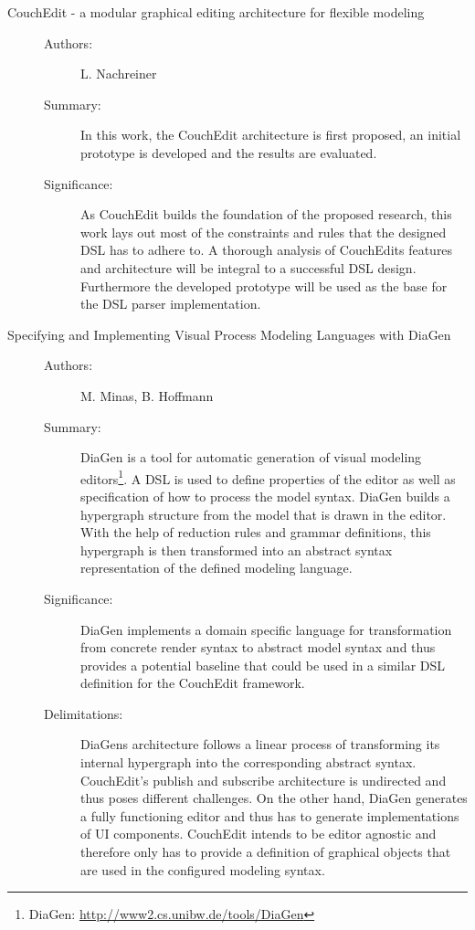 \documentclass[10pt,a4paper,oneside]{scrartcl}
\begin{document}
\begin{description}
  \item[CouchEdit - a modular graphical editing architecture for flexible modeling] \cite{nachreiner_couchedit_2020}

        \begin{description}
          \item[Authors:] L. Nachreiner
          \item[Summary:] In this work, the CouchEdit architecture is first proposed, an initial prototype is developed and the results are evaluated.
          \item[Significance:] As CouchEdit builds the foundation of the proposed research, this work lays out most of the constraints and rules that the designed DSL has to adhere to. A thorough analysis of CouchEdits features and architecture will be integral to a successful DSL design. Furthermore the developed prototype will be used as the base for the DSL parser implementation.

        \end{description}

  \item[Specifying and Implementing Visual Process Modeling Languages with DiaGen] \cite{minas_specifying_2001}
        \begin{description}
          \item[Authors:] M. Minas, B. Hoffmann
          \item[Summary:] DiaGen is a tool for automatic generation of visual modeling editors\footnote{DiaGen: \url{http://www2.cs.unibw.de/tools/DiaGen}}. A DSL is used to define properties of the editor as well as specification of how to process the model syntax. DiaGen builds a hypergraph structure from the model that is drawn in the editor. With the help of reduction rules and grammar definitions, this hypergraph is then transformed into an abstract syntax representation of the defined modeling language.
          \item[Significance:]  DiaGen implements a domain specific language for transformation from concrete render syntax to abstract model syntax and thus provides a potential baseline that could be used in a similar DSL definition for the CouchEdit framework.
          \item[Delimitations:] DiaGens architecture follows a linear process of transforming its internal hypergraph into the corresponding abstract syntax. CouchEdit's publish and subscribe architecture is undirected and thus poses different challenges. On the other hand, DiaGen generates a fully functioning editor and thus has to generate implementations of UI components. CouchEdit intends to be editor agnostic and therefore only has to provide a definition of graphical objects that are used in the configured modeling syntax.


\end{description}
\end{description}
\end{document}

